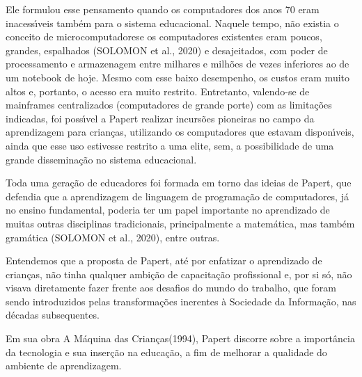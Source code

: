 \documentclass[
12pt,		%
openright,	%
twoside,  %
a4paper,			%
chapter=TITLE,		%
english,			%
french,				%
spanish,			%
brazil				%
]{USPSC-classe/USPSC}
\begin{document}
\noindent\begin{center}\mbox{\centering{}}\end{center}


Ele formulou esse pensamento quando os computadores dos anos 70 eram inacess\'{\i}veis tamb\'em para o sistema educacional. Naquele tempo, n\~ao existia o conceito de \textquotedbl microcomputadores\textquotedbl  e os computadores existentes eram poucos, grandes, espalhados  (SOLOMON et al., 2020) e desajeitados, com poder de processamento e armazenagem entre milhares e milh\~oes de vezes inferiores ao de um notebook de hoje. Mesmo com esse baixo desempenho, os custos eram muito altos e, portanto, o acesso era muito restrito. Entretanto, valendo-se de mainframes centralizados (computadores de grande porte) com as limita\c{c}\~oes indicadas, foi poss\'{\i}vel a Papert realizar incurs\~oes pioneiras no campo da aprendizagem para crian\c{c}as, utilizando os computadores que estavam dispon\'{\i}veis, ainda que esse uso estivesse restrito a uma elite, sem, a possibilidade de uma grande dissemina\c{c}\~ao no sistema educacional.




Toda uma gera\c{c}\~ao de educadores foi formada em torno das ideias de Papert, que defendia que a aprendizagem de linguagem de programa\c{c}\~ao de computadores, j\'a no ensino fundamental, poderia ter um papel importante no aprendizado de muitas outras disciplinas tradicionais, principalmente a matem\'atica, mas tamb\'em gram\'atica (SOLOMON et al., 2020), entre outras.




Entendemos que a proposta de Papert, at\'e por enfatizar o aprendizado de crian\c{c}as, n\~ao tinha qualquer ambi\c{c}\~ao de capacita\c{c}\~ao profissional e, por si s\'o, n\~ao visava diretamente fazer frente aos desafios do \textquotedbl mundo do trabalho\textquotedbl , que foram sendo introduzidos pelas transforma\c{c}\~oes inerentes \`a Sociedade da Informa\c{c}\~ao, nas d\'ecadas subsequentes.




Em sua obra \textquotedbl A M\'aquina das Crian\c{c}as\textquotedbl  (1994), Papert discorre sobre a import\^ancia da tecnologia e sua inser\c{c}\~ao na educa\c{c}\~ao, a fim de melhorar a qualidade do ambiente de aprendizagem.
\end{document}
